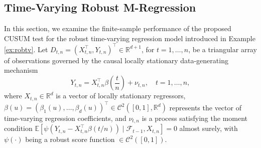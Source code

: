 \documentclass[10pt, a4paper]{article}
\theoremstyle{assumption}
\theoremstyle{definition}
\theoremstyle{theorem}
\begin{document}



\newpage
\subsection{Time-Varying Robust M-Regression}

In this section, we examine the finite-sample performance of the proposed CUSUM test for the robust time-varying regression model introduced in Example \ref{ex:robtv}. 
Let $D_{t,n} = (X_{t,n}^\top, Y_{t,n})^\top \in \mathbb{R}^{d+1}$, for $t = 1, \dots, n$, be a triangular array of observations governed by the causal locally stationary data-generating mechanism
\begin{equation}
    Y_{t,n} = X_{t,n}^\top \beta\left(\frac{t}{n}\right) + \nu_{t,n}, \quad t = 1, \dots, n,
\end{equation}
where $X_{t,n} \in \mathbb{R}^d$ is a vector of locally stationary regressors, $\beta(u) = (\beta_1(u), \dots, \beta_d(u))^\top \in \mathcal{C}^2([0, 1], \mathbb{R}^d)$ represents the vector of time-varying regression coefficients, and $\nu_{t,n}$ is a process satisfying the moment condition $\mathbb{E}[\psi(Y_{t,n} - X_{t,n}^\top \beta(t/n)) \mid \mathcal{F}_{t-1}, X_{t,n}] = 0$ almost surely, with $\psi(\cdot)$ being a robust score function $\in \mathcal{C}^2([0, 1]) $.
\end{document}
